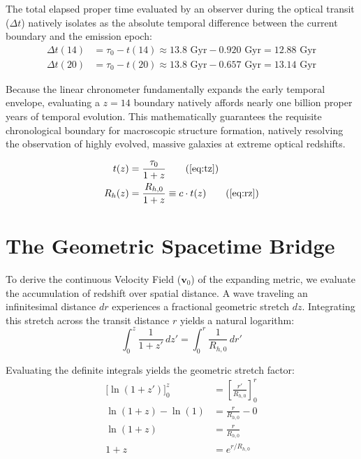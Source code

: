 \documentclass[11pt, a4paper]{article}
\begin{document}
The total elapsed proper time evaluated by an observer during the optical transit ($\Delta t$) natively isolates as the absolute temporal difference between the current boundary and the emission epoch:
\begin{align}
    \Delta t(14) &= \tau_0 - t(14) \approx 13.8 \text{ Gyr} - 0.920 \text{ Gyr} = 12.88 \text{ Gyr} \\
    \Delta t(20) &= \tau_0 - t(20) \approx 13.8 \text{ Gyr} - 0.657 \text{ Gyr} = 13.14 \text{ Gyr}
\end{align}

Because the linear chronometer fundamentally expands the early temporal envelope, evaluating a $z=14$ boundary natively affords nearly one billion proper years of temporal evolution. This mathematically guarantees the requisite chronological boundary for macroscopic structure formation, natively resolving the observation of highly evolved, massive galaxies at extreme optical redshifts.

\begin{tcolorbox}[recallbox, title={\ref{box:chronometer}. The High-Redshift Chronometer}]
\begin{align}
    t(z) &= \frac{\tau_0}{1+z} \tag{\ref{eq:tz}} \\
    R_h(z) &= \frac{R_{h,0}}{1+z} \equiv c \cdot t(z) \tag{\ref{eq:rz}}
\end{align}
\end{tcolorbox}


\section{The Geometric Spacetime Bridge}
\label{sec:deriv_gr_bridge}
To derive the continuous Velocity Field ($\mathbf{v}_0$) of the expanding metric, we evaluate the accumulation of redshift over spatial distance. A wave traveling an infinitesimal distance $dr$ experiences a fractional geometric stretch $dz$. Integrating this stretch across the transit distance $r$ yields a natural logarithm:
\begin{equation}
    \int_0^z \frac{1}{1+z'} \, dz' = \int_0^r \frac{1}{R_{h,0}} \, dr'
\end{equation}

Evaluating the definite integrals yields the geometric stretch factor:
\begin{align}
    \Big[ \ln(1+z') \Big]_0^z &= \left[ \frac{r'}{R_{h,0}} \right]_0^r \\
    \ln(1+z) - \ln(1) &= \frac{r}{R_{h,0}} - 0 \\
    \ln(1+z) &= \frac{r}{R_{h,0}} \\
    1+z &= e^{r/R_{h,0}}
\end{align}
\end{document}
